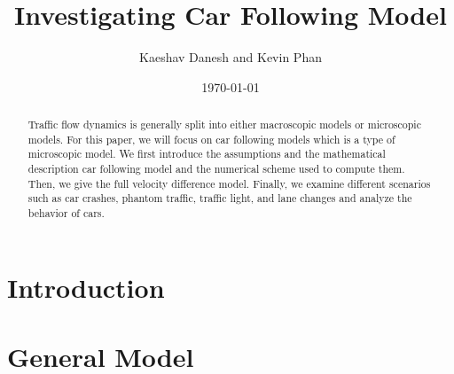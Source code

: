 \documentclass[12pt]{article}
\title{Investigating Car Following Model}
\author{Kaeshav Danesh and Kevin Phan}
\date{\today}
\begin{document}
    \maketitle

    \begin{abstract}
        Traffic flow dynamics is generally split into either macroscopic models or microscopic models. For this paper, we will focus on car following models which is a type of microscopic model. We first introduce the assumptions and the mathematical description car following model and the numerical scheme used to compute them. Then, we give the full velocity difference model. Finally, we examine different scenarios such as car crashes, phantom traffic, traffic light, and lane changes and analyze the behavior of cars. 
    \end{abstract}

    \tableofcontents

    \section{Introduction}
    

    \section{General Model}
\end{document}
